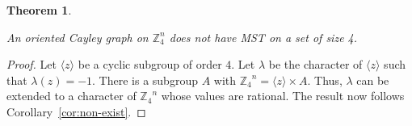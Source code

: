 \documentclass{amsart}
\theoremstyle{plain}
\newtheorem{theorem}{Theorem}[section]
\theoremstyle{remark}\newtheorem{con}[theorem]{Construction}
\theoremstyle{remark} \newtheorem*{remark}{Remark}
\theoremstyle{remark} \newtheorem{example}{Example}
\newcommand{\bb}{\mathbb}
\newcommand{\mrm}{\mathrm}
\newcommand{\mbf}{\mathbf}
\begin{document}
\begin{theorem}\label{thm:NoOrder4}

    An oriented Cayley graph on $\bb{Z}_4^n$ does not have MST on a set of size 4.
\end{theorem}
\begin{proof}
Let $\langle z\rangle$ be a cyclic subgroup of order $4$. Let $\lambda$ be the character of $\langle z\rangle$ such that $\lambda(z)=-1$. There is a subgroup $A$ with ${\mathbb Z_4}^n=\langle z\rangle\times A$. Thus, $\lambda$ can be extended to a character of ${\mathbb Z_4}^n$  whose values are rational. The result now follows Corollary~\ref{cor:non-exist}.
\end{proof}

\end{document}
